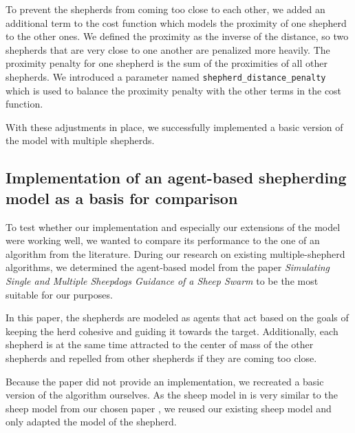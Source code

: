 To prevent the shepherds from coming too close to each other, we added an additional term to the cost function which models the proximity of one shepherd to the other ones. We defined the proximity as the inverse of the distance, so two shepherds that are very close to one another are penalized more heavily. The proximity penalty for one shepherd is the sum of the proximities of all other shepherds. We introduced a parameter named \texttt{shepherd\_distance\_penalty} which is used to balance the proximity penalty with the other terms in the cost function.

With these adjustments in place, we successfully implemented a basic version of the model with multiple shepherds.

\subsection{Implementation of an agent-based shepherding model as a basis for comparison}

To test whether our implementation and especially our extensions of the model were working well, we wanted to compare its performance to the one of an algorithm from the literature. During our research on existing multiple-shepherd algorithms, we determined the agent-based model from the paper \textit{Simulating Single and Multiple Sheepdogs Guidance of a Sheep Swarm} \cite{baxter2021simulating} to be the most suitable for our purposes.

In this paper, the shepherds are modeled as agents that act based on the goals of keeping the herd cohesive and guiding it towards the target. Additionally, each shepherd is at the same time attracted to the center of mass of the other shepherds and repelled from other shepherds if they are coming too close.

Because the paper did not provide an implementation, we recreated a basic version of the algorithm ourselves. As the sheep model in \cite{baxter2021simulating} is very similar to the sheep model from our chosen paper \cite{ranganathan2022optimal}, we reused our existing sheep model and only adapted the model of the shepherd.
